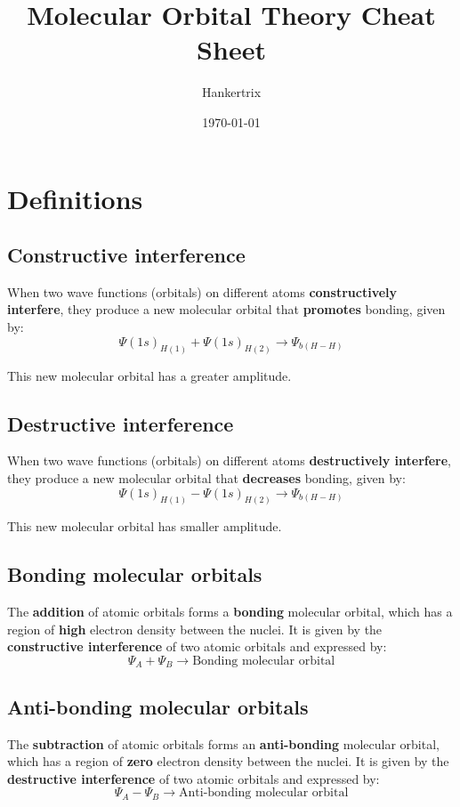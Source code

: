 \documentclass[11pt]{article}
\author{Hankertrix}
\date{\today}
\title{Molecular Orbital Theory Cheat Sheet}
\begin{document}
\maketitle
\setcounter{tocdepth}{2}
\tableofcontents

\newpage

\section{Definitions}
\label{sec:orgb4ce093}

\subsection{Constructive interference}
\label{sec:org0ec7e03}
When two wave functions (orbitals) on different atoms \textbf{constructively interfere}, they produce a new molecular orbital that \textbf{promotes} bonding, given by:
\[\Psi(1s)_{H(1)} + \Psi(1s)_{H(2)} \rightarrow \Psi_{b(H-H)}\]

This new molecular orbital has a greater amplitude.

\subsection{Destructive interference}
\label{sec:org07c7abf}
When two wave functions (orbitals) on different atoms \textbf{destructively interfere}, they produce a new molecular orbital that \textbf{decreases} bonding, given by:
\[\Psi(1s)_{H(1)} - \Psi(1s)_{H(2)} \rightarrow \Psi_{b(H-H)}\]

This new molecular orbital has smaller amplitude.

\subsection{Bonding molecular orbitals}
\label{sec:orgae32cda}
The \textbf{addition} of atomic orbitals forms a \textbf{bonding} molecular orbital, which has a region of \textbf{high} electron density between the nuclei. It is given by the \textbf{constructive interference} of two atomic orbitals and expressed by:
\[\Psi_A + \Psi_B \rightarrow \text{Bonding molecular orbital}\]

\subsection{Anti-bonding molecular orbitals}
\label{sec:org0e19ca2}
The \textbf{subtraction} of atomic orbitals forms an \textbf{anti-bonding} molecular orbital, which has a region of \textbf{zero} electron density between the nuclei. It is given by the \textbf{destructive interference} of two atomic orbitals and expressed by:
\[\Psi_A - \Psi_B \rightarrow \text{Anti-bonding molecular orbital}\]
\end{document}
